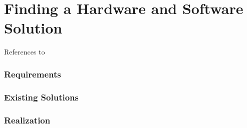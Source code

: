 \chapter{Finding a Hardware and Software Solution}
References to \cite{kammermann}
\subsection{Requirements}
\subsection{Existing Solutions}
\subsection{Realization}